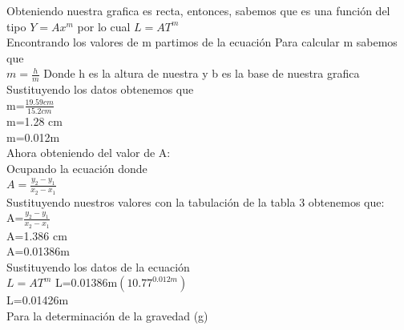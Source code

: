 \documentclass[10pt]{article}
\begin{document}
\begin{multicols}{2}
	
	Obteniendo nuestra grafica es recta, entonces, sabemos que es una función del tipo $Y=Ax^m$ por lo cual $L=AT^m $ \\
	Encontrando los valores de m partimos de la ecuación 
	Para calcular m sabemos que \\
	$m=\frac{h}{m}$
	Donde h es la altura de nuestra y b es la base de nuestra grafica 
	Sustituyendo los datos obtenemos que \\
	
	m=$\frac{19.59cm}{15.2cm}$ \\
	m=1.28 cm \\
	m=0.012m \\
	Ahora obteniendo del valor de A: \\
Ocupando la ecuación donde \\

$A=  \frac{y_2-y_1}{x_2-x_1}$ \\
Sustituyendo nuestros valores con la tabulación de la tabla 3 obtenemos que: \\
A=$  \frac{y_2-y_1}{x_2-x_1}$\\
A=1.386 cm  \\
A=0.01386m \\
Sustituyendo los datos de la ecuación \\
$L=AT^m$
L=0.01386m$ (10.77^{0.012m})$ \\
L=0.01426m \\
Para la determinación de la gravedad (g)  \\


\end{multicols}
\end{document}
